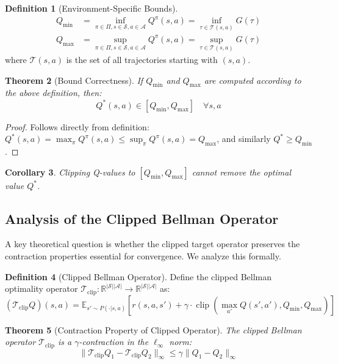 \documentclass[11pt]{article}
\newtheorem{theorem}{Theorem}
\newtheorem{corollary}[theorem]{Corollary}
\theoremstyle{definition}
\newtheorem{definition}[theorem]{Definition}
\theoremstyle{remark}
\newcommand{\E}{\mathbb{E}}
\DeclareMathOperator{\clip}{clip}
\begin{document}
\begin{definition}[Environment-Specific Bounds]
\begin{align}
Q_{\min} &= \inf_{\pi \in \Pi, s \in \mathcal{S}, a \in \mathcal{A}} Q^\pi(s,a) = \inf_{\tau \in \mathcal{T}(s,a)} G(\tau) \\
Q_{\max} &= \sup_{\pi \in \Pi, s \in \mathcal{S}, a \in \mathcal{A}} Q^\pi(s,a) = \sup_{\tau \in \mathcal{T}(s,a)} G(\tau)
\end{align}
where $\mathcal{T}(s,a)$ is the set of all trajectories starting with $(s,a)$.
\end{definition}

\begin{theorem}[Bound Correctness]
\label{thm:bound-correctness}
If $Q_{\min}$ and $Q_{\max}$ are computed according to the above definition, then:
$$Q^*(s,a) \in [Q_{\min}, Q_{\max}] \quad \forall s,a$$
\end{theorem}

\begin{proof}
Follows directly from definition: $Q^*(s,a) = \max_\pi Q^\pi(s,a) \leq \sup_\pi Q^\pi(s,a) = Q_{\max}$, and similarly $Q^* \geq Q_{\min}$.
\end{proof}

\begin{corollary}
Clipping Q-values to $[Q_{\min}, Q_{\max}]$ cannot remove the optimal value $Q^*$.
\end{corollary}

\subsection{Analysis of the Clipped Bellman Operator}
\label{sec:clipped-bellman-analysis}

A key theoretical question is whether the clipped target operator preserves the contraction properties essential for convergence. We analyze this formally.

\begin{definition}[Clipped Bellman Operator]
Define the clipped Bellman optimality operator $\mathcal{T}_{\text{clip}}: \mathbb{R}^{|\mathcal{S}||\mathcal{A}|} \to \mathbb{R}^{|\mathcal{S}||\mathcal{A}|}$ as:
$$(\mathcal{T}_{\text{clip}} Q)(s,a) = \E_{s' \sim P(\cdot|s,a)}\left[r(s,a,s') + \gamma \cdot \clip\left(\max_{a'} Q(s',a'), Q_{\min}, Q_{\max}\right)\right]$$
\end{definition}

\begin{theorem}[Contraction Property of Clipped Operator]
\label{thm:clipped-contraction}
The clipped Bellman operator $\mathcal{T}_{\text{clip}}$ is a $\gamma$-contraction in the $\ell_\infty$ norm:
$$\|\mathcal{T}_{\text{clip}} Q_1 - \mathcal{T}_{\text{clip}} Q_2\|_\infty \leq \gamma \|Q_1 - Q_2\|_\infty$$
\end{theorem}
\end{document}
